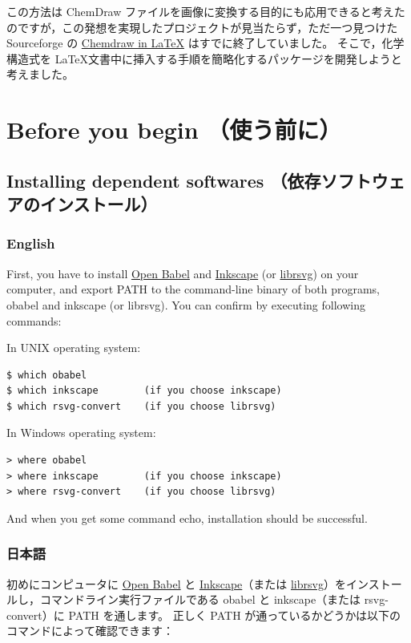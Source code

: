 \documentclass[12pt]{jsarticle}
\begin{document}
この方法は ChemDraw ファイルを画像に変換する目的にも応用できると考えたのですが，この発想を実現したプロジェクトが見当たらず，ただ一つ見つけた Sourceforge の \href{http://chemdrawinlatex.sourceforge.net/}{Chemdraw in \LaTeX} はすでに終了していました。
そこで，化学構造式を \LaTeX 文書中に挿入する手順を簡略化するパッケージを開発しようと考えました。

\clearpage

\section{Before you begin （使う前に）}

\subsection{Installing dependent softwares （依存ソフトウェアのインストール）}

\subsubsection{English}

First, you have to install \href{http://openbabel.org/}{Open Babel} and \href{https://inkscape.org/en/}{Inkscape} (or \href{http://librsvg.sourceforge.net/download/}{librsvg}) on your computer, and export PATH to the command-line binary of both programs, obabel and inkscape (or librsvg).
You can confirm by executing following commands:

In UNIX operating system:
\begin{verbatim}
$ which obabel
$ which inkscape        (if you choose inkscape)
$ which rsvg-convert    (if you choose librsvg)
\end{verbatim}

In Windows operating system:
\begin{verbatim}
> where obabel
> where inkscape        (if you choose inkscape)
> where rsvg-convert    (if you choose librsvg)
\end{verbatim}

And when you get some command echo, installation should be successful.

\subsubsection{日本語}

初めにコンピュータに \href{http://openbabel.org/}{Open Babel} と \href{https://inkscape.org/ja/}{Inkscape}（または \href{http://librsvg.sourceforge.net/download/}{librsvg}）をインストールし，コマンドライン実行ファイルである obabel と inkscape（または rsvg-convert）に PATH を通します。
正しく PATH が通っているかどうかは以下のコマンドによって確認できます：
\end{document}
